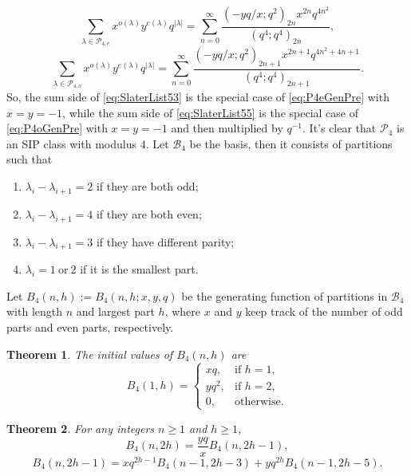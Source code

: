 \documentclass[12pt]{amsart}
\newtheorem{theorem}{Theorem}[section]
\theoremstyle{definition}
\theoremstyle{remark}
\numberwithin{equation}{section}
\begin{document}
\begin{equation}\label{eq:P4eGenPre}
\sum_{\lambda\in\mathcal{P}_{4,e}}x^{o(\lambda)}y^{e(\lambda)}q^{|\lambda|}=\sum_{n=0}^{\infty}\frac{(-yq/x;q^2)_{2n}x^{2n}q^{4n^2}}{(q^4;q^4)_{2n}},
\end{equation}
\begin{equation}\label{eq:P4oGenPre}
\sum_{\lambda\in\mathcal{P}_{4,o}}x^{o(\lambda)}y^{e(\lambda)}q^{|\lambda|}=\sum_{n=0}^{\infty}\frac{(-yq/x;q^2)_{2n+1}x^{2n+1}q^{4n^2+4n+1}}{(q^4;q^4)_{2n+1}}.
\end{equation}
So, the sum side of \ref{eq:SlaterList53} is the special case of \ref{eq:P4eGenPre} with $x=y=-1$, while the sum side of \ref{eq:SlaterList55} is the special case of \ref{eq:P4oGenPre} with $x=y=-1$ and then multiplied by $q^{-1}$.
It's clear that $\mathcal{P}_4$ is an SIP class with modulus $4$. Let $\mathcal{B}_4$ be the basis, then it consists of partitions such that
\begin{enumerate}
    \item $\lambda_i-\lambda_{i+1}=2$ if they are both odd;
    \item $\lambda_i-\lambda_{i+1}=4$ if they are both even;
    \item $\lambda_{i}-\lambda_{i+1}=3$ if they have different parity;
    \item $\lambda_{i}=1\ \text{or}\ 2$ if it is the smallest part.
\end{enumerate}
Let $B_{4}(n,h):=B_4(n,h;x,y,q)$ be the generating function of partitions in $\mathcal{B}_4$ with length $n$ and largest part $h$, where $x$ and $y$ keep track of the number of odd parts and even parts, respectively.
\begin{theorem}
The initial values of $B_4(n,h)$ are
\begin{equation}\label{eq:InitialB4}
B_{4}(1,h)=\begin{cases}
xq,     &  \text{if $h=1$},\\
yq^2,   &  \text{if $h=2$},\\
0,      &  \text{otherwise}.
\end{cases}
\end{equation}
\end{theorem}

\begin{theorem}
For any integers $n\geq1$ and $h\geq1$,
\begin{equation}\label{eq:B4EvenRec}
B_4(n,2h)=\frac{yq}{x}B_4(n,2h-1),    
\end{equation}
\begin{equation}\label{eq:B4OddRec}
B_4(n,2h-1)=xq^{2h-1}B_4(n-1,2h-3)+yq^{2h}B_4(n-1,2h-5).
\end{equation}
\end{theorem}
\end{document}
